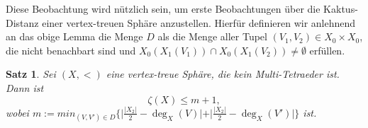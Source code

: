 \documentclass[12pt,titlepage,twoside,cleardoublepage]{article}
\theoremstyle{nummermitklammern}
\newtheorem{satz}[temp]{Satz}
\newtheorem{satz}[zahl]{Satz}
\numberwithin{equation}{section}
\begin{document}

Diese Beobachtung wird nützlich sein, um erste Beobachtungen über die Kaktus-Distanz einer vertex-treuen Sphäre anzustellen. Hierfür definieren wir anlehnend an das obige Lemma die Menge $D$ als die Menge aller Tupel $(V_1,V_2)\in X_0 \times X_0$, die nicht benachbart sind und $ X_0(X_1(V_1))\cap X_0(X_1(V_2))\neq \emptyset$ erfüllen.
\begin{satz}
Sei $(X,<)$ eine vertex-treue Sphäre, die kein Multi-Tetraeder ist. Dann ist 
\[
\zeta(X)\leq m+1,
\] wobei $m:=min_{(V,V')\in D}\{\vert\frac{\vert X_2 \vert}{2}-\deg_X(V)\vert +\vert \frac{\vert X_2 \vert}{2}-\deg_X(V')\vert\}$
 ist.
\end{satz}
\end{document}
